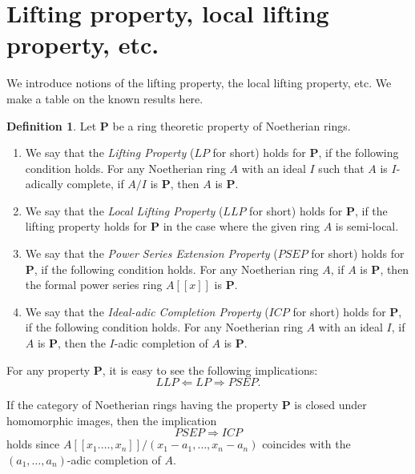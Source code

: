 \documentclass[11pt,a4paper]{amsart}
\theoremstyle{definition}
\newtheorem{definition}[theorem]{Definition}
\theoremstyle{remark}
\begin{document}
\appendix
\section{Lifting property, local lifting property, etc.}
\label{appA}

We introduce notions of the lifting property, the local lifting property, etc.
We make a table on the known results here.

\begin{definition}
\label{GrothendieckLifting}
Let $\mathbf{P}$ be a ring theoretic property of Noetherian rings.

\begin{enumerate}
\item
We say that the \textit{Lifting Property} ($LP$ for short) holds for $\mathbf{P}$, if the following condition holds. For any Noetherian ring $A$ with an ideal $I$ such that $A$ is $I$-adically complete, if $A/I$ is $\mathbf{P}$, then $A$ is $\mathbf{P}$.

\item
We say that the \textit{Local Lifting Property} ($LLP$ for short) holds for $\mathbf{P}$, if the lifting property holds for $\mathbf{P}$ in the case where the given ring $A$ is semi-local.

\item
We say that the  \textit{Power Series Extension Property} ($PSEP$ for short) holds for $\mathbf{P}$, if the following condition holds. For any Noetherian ring $A$, if $A$ is $\mathbf{P}$, then the formal power series ring $A[[x]]$ is $\mathbf{P}$.

\item
We say that the  \textit{Ideal-adic Completion Property} ($ICP$ for short) holds for $\mathbf{P}$, if the following condition holds. For any Noetherian ring $A$ with an ideal $I$, if $A$ is $\mathbf{P}$, then the $I$-adic completion of $A$ is $\mathbf{P}$.
\end{enumerate}
\end{definition}


For any property $\mathbf{P}$, it is easy to see the following implications:
\[
LLP \Longleftarrow LP \Longrightarrow PSEP .   
\]

If the category of Noetherian rings having the property $\mathbf{P}$ is closed
under homomorphic images, then the implication 
\[
PSEP \Longrightarrow ICP
\]
holds since $A[[x_1. \ldots, x_n]]/(x_1-a_1, \ldots, x_n-a_n)$ coincides with the $(a_1, \ldots, a_n)$-adic completion of $A$.
\end{document}
